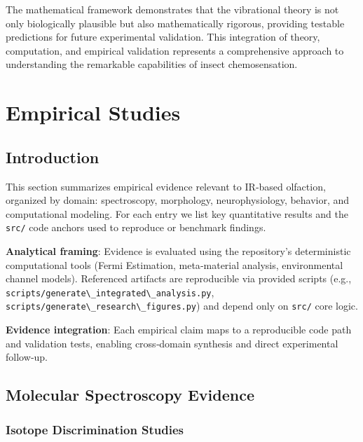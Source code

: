 \documentclass[
  13pt,
  a4paperpaper,
  12pt]{article}
\newcommand{\passthrough}[1]{#1}
\let\oldsection\section
\renewcommand{\section}{\clearpage\oldsection}
\begin{document}
The mathematical framework demonstrates that the vibrational theory is
not only biologically plausible but also mathematically rigorous,
providing testable predictions for future experimental validation. This
integration of theory, computation, and empirical validation represents
a comprehensive approach to understanding the remarkable capabilities of
insect chemosensation.

\section{Empirical Studies}\label{sec:empirical_studies}

\subsection{Introduction}\label{introduction-1}

This section summarizes empirical evidence relevant to IR‑based
olfaction, organized by domain: spectroscopy, morphology,
neurophysiology, behavior, and computational modeling. For each entry we
list key quantitative results and the \passthrough{\lstinline!src/!}
code anchors used to reproduce or benchmark findings.

\textbf{Analytical framing}: Evidence is evaluated using the
repository's deterministic computational tools (Fermi Estimation,
meta‑material analysis, environmental channel models). Referenced
artifacts are reproducible via provided scripts (e.g.,
\passthrough{\lstinline!scripts/generate\_integrated\_analysis.py!},
\passthrough{\lstinline!scripts/generate\_research\_figures.py!}) and
depend only on \passthrough{\lstinline!src/!} core logic.

\textbf{Evidence integration}: Each empirical claim maps to a
reproducible code path and validation tests, enabling cross‑domain
synthesis and direct experimental follow‑up.

\subsection{Molecular Spectroscopy
Evidence}\label{molecular-spectroscopy-evidence}

\subsubsection{Isotope Discrimination
Studies}\label{isotope-discrimination-studies}
\end{document}
